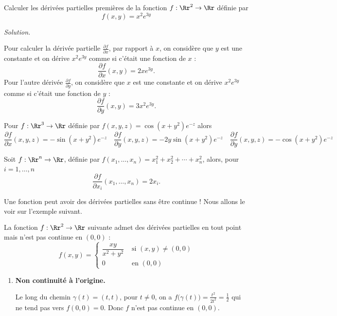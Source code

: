 \documentclass[12pt, class=report,crop=false]{standalone}
\begin{document}
{\begin{exemple}
Calculer les dérivées partielles premières de la fonction 
$f : \Rr^2 \to \Rr$ définie par 
$$f(x,y)=x^2e^{3y}$$

\bigskip
\emph{Solution.}

Pour calculer la dérivée partielle $\frac{\partial f}{\partial x}$, par rapport à $x$, on considère que $y$ est une constante et on dérive $x^2e ^{3y}$ comme si c'était une fonction de $x$ :
$$\frac{\partial f}{\partial x}(x,y) =2xe ^{3y}.$$
Pour l'autre dérivée  $\frac{\partial f}{\partial y}$, on considère que $x$ est une constante et on dérive $x^2e ^{3y}$ comme si c'était une fonction de $y$ :
$$\frac{\partial f}{\partial y}(x,y) = 3x^2e ^{3y}.$$
\end{exemple}



\begin{exemple}
Pour $f : \Rr^3 \to \Rr$ définie par $f(x,y,z)=\cos (x+y^2)e^{-z}$
alors 
$$\frac{\partial f}{\partial x}(x,y,z) = -\sin(x+y^2)e^{-z} \quad
\frac{\partial f}{\partial y}(x,y,z) = -2y\sin(x+y^2)e^{-z} \quad
\frac{\partial f}{\partial y}(x,y,z) = -\cos(x+y^2)e^{-z}$$
\end{exemple}


\begin{exemple}
Soit $f :\Rr^n \to \Rr$, définie par 
$f(x_1,\ldots,x_n) = x_1^2+x_2^2+\cdots + x_n^2$,
alors, pour $i=1,\ldots,n$ 
$$\frac{\partial f}{\partial x_i}(x_1,\ldots,x_n) = 2x_i.$$
\end{exemple}


\bigskip

Une fonction peut avoir des dérivées partielles sans être continue !
Nous allons le voir sur l'exemple suivant.
\begin{exemple}
La fonction $f : \Rr^2 \to \Rr$ suivante admet des dérivées partielles en tout point mais n'est pas continue en $(0,0)$ :
$$f(x,y) = \left \lbrace
\begin{array}{ll}
\dfrac{xy}{x^2 + y^2} & \text{ si } (x,y) \neq (0,0) \\
0 & \text{ en } (0,0)
\end{array}
\right.$$


\begin{enumerate}
  \item \textbf{Non continuité à l'origine.} 
  
   Le long du chemin $\gamma(t) = (t,t)$, pour $t\neq 0$, on a $f\big( \gamma(t) \big) = \frac{t^2}{2t^2} = \frac 12$ qui ne tend pas vers $f(0,0)=0$. Donc $f$ n'est pas continue en $(0,0)$.
  

\end{enumerate}
\end{exemple}}
\end{document}
